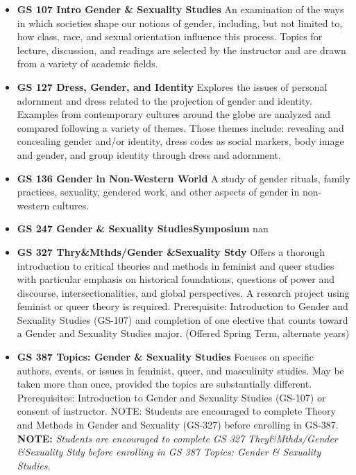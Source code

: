 \documentclass[
  letterpaper,
]{scrbook}
\providecommand{\tightlist}{%
  \setlength{\itemsep}{0pt}\setlength{\parskip}{0pt}}
\begin{document}
\begin{itemize}
\tightlist
\item
  \textbf{GS 107 Intro Gender \& Sexuality Studies} An examination of
  the ways in which societies shape our notions of gender, including,
  but not limited to, how class, race, and sexual orientation influence
  this process. Topics for lecture, discussion, and readings are
  selected by the instructor and are drawn from a variety of academic
  fields.
\item
  \textbf{GS 127 Dress, Gender, and Identity} Explores the issues of
  personal adornment and dress related to the projection of gender and
  identity. Examples from contemporary cultures around the globe are
  analyzed and compared following a variety of themes. Those themes
  include: revealing and concealing gender and/or identity, dress codes
  as social markers, body image and gender, and group identity through
  dress and adornment.
\item
  \textbf{GS 136 Gender in Non-Western World} A study of gender rituals,
  family practices, sexuality, gendered work, and other aspects of
  gender in non-western cultures.
\item
  \textbf{GS 247 Gender \& Sexuality StudiesSymposium} nan
\item
  \textbf{GS 327 Thry\&Mthds/Gender \&Sexuality Stdy} Offers a thorough
  introduction to critical theories and methods in feminist and queer
  studies with particular emphasis on historical foundations, questions
  of power and discourse, intersectionalities, and global perspectives.
  A research project using feminist or queer theory is required.
  Prerequisite: Introduction to Gender and Sexuality Studies (GS-107)
  and completion of one elective that counts toward a Gender and
  Sexuality Studies major. (Offered Spring Term, alternate years)
\item
  \textbf{GS 387 Topics: Gender \& Sexuality Studies} Focuses on
  specific authors, events, or issues in feminist, queer, and
  masculinity studies. May be taken more than once, provided the topics
  are substantially different. Prerequisites: Introduction to Gender and
  Sexuality Studies (GS-107) or consent of instructor. NOTE: Students
  are encouraged to complete Theory and Methods in Gender and Sexuality
  (GS-327) before enrolling in GS-387. \textbf{NOTE:} \emph{Students are
  encouraged to complete GS 327 Thry\&Mthds/Gender \&Sexuality Stdy
  before enrolling in GS 387 Topics: Gender \& Sexuality Studies. }
\end{itemize}
\end{document}
